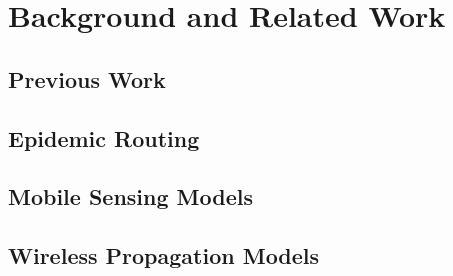 \chapter{Background and Related Work}\label{background}




\section{Previous Work}\label{background_previous_work}

\section{Epidemic Routing}\label{background_epidemic_routing}



\section{Mobile Sensing Models}\label{background_mobile_sensing_models}

\section{Wireless Propagation Models}

